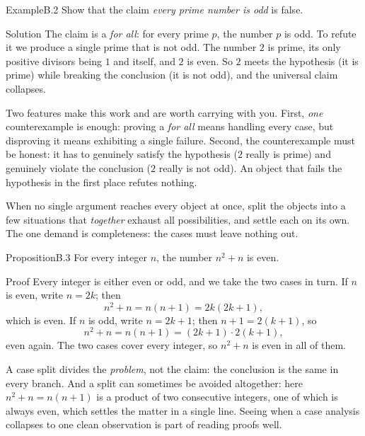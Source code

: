 \documentclass[a4paper,12pt,oneside]{memoir}
\begin{document}
\begin{workedexample}
\begin{envexample}{Example}{B.2}{}
Show that the claim \emph{every prime number is odd} is false.
\end{envexample}
\begin{envsolution}{Solution}{}{}
The claim is a \emph{for all}: for every prime \(p\), the number \(p\) is odd. To refute it we produce a single prime that is not odd. The number \(2\) is prime, its only positive divisors being \(1\) and itself, and \(2\) is even. So \(2\) meets the hypothesis (it is prime) while breaking the conclusion (it is not odd), and the universal claim collapses.

Two features make this work and are worth carrying with you. First, \emph{one} counterexample is enough: proving a \emph{for all} means handling every case, but disproving it means exhibiting a single failure. Second, the counterexample must be honest: it has to genuinely satisfy the hypothesis (\(2\) really is prime) and genuinely violate the conclusion (\(2\) really is not odd). An object that fails the hypothesis in the first place refutes nothing.
\end{envsolution}
\end{workedexample}
 When no single argument reaches every object at once, split the objects into a few situations that \emph{together} exhaust all possibilities, and settle each on its own. The one demand is completeness: the cases must leave nothing out.

\begin{envproposition}{Proposition}{B.3}{}
For every integer \(n\), the number \(n^{2} + n\) is even.
\end{envproposition}
\begin{envproof}{Proof}{}{}
Every integer is either even or odd, and we take the two cases in turn. If \(n\) is even, write \(n = 2k\); then \[ n^{2} + n = n(n + 1) = 2k(2k + 1), \] which is even. If \(n\) is odd, write \(n = 2k + 1\); then \(n + 1 = 2(k + 1)\), so \[ n^{2} + n = n(n + 1) = (2k + 1)\cdot 2(k + 1), \] even again. The two cases cover every integer, so \(n^{2} + n\) is even in all of them. \qedmark
\end{envproof}
A case split divides the \emph{problem}, not the claim: the conclusion is the same in every branch. And a split can sometimes be avoided altogether: here \(n^{2} + n = n(n + 1)\) is a product of two consecutive integers, one of which is always even, which settles the matter in a single line. Seeing when a case analysis collapses to one clean observation is part of reading proofs well.
\end{document}
